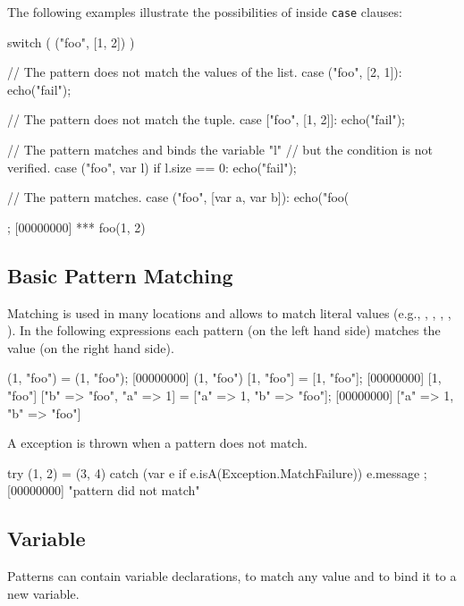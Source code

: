 The following examples illustrate the possibilities of  inside \lstinline{case} clauses:

\begin{urbiscript}
switch ( ("foo", [1, 2]) )
{
  // The pattern does not match the values of the list.
  case ("foo", [2, 1]):
    echo("fail");

  // The pattern does not match the tuple.
  case ["foo", [1, 2]]:
    echo("fail");

  // The pattern matches and binds the variable "l"
  // but the condition is not verified.
  case ("foo", var l) if l.size == 0:
    echo("fail");

  // The pattern matches.
  case ("foo", [var a, var b]):
    echo("foo(%
};
[00000000] *** foo(1, 2)
\end{urbiscript}

\subsection{Basic Pattern Matching}

Matching is used in many locations and allows to match literal values (e.g.,
, , ,
, ).  In the following expressions each
pattern (on the left hand side) matches the value (on the right hand side).

\begin{urbiscript}
(1, "foo") = (1, "foo");
[00000000] (1, "foo")
[1, "foo"] = [1, "foo"];
[00000000] [1, "foo"]
["b" => "foo", "a" => 1] = ["a" => 1, "b" => "foo"];
[00000000] ["a" => 1, "b" => "foo"]
\end{urbiscript}

A  exception is thrown when a pattern does
not match.

\begin{urbiscript}
try
{
  (1, 2) = (3, 4)
}
catch (var e if e.isA(Exception.MatchFailure))
{
  e.message
};
[00000000] "pattern did not match"
\end{urbiscript}

\subsection{Variable}

Patterns can contain variable declarations, to match any value and to bind
it to a new variable.


